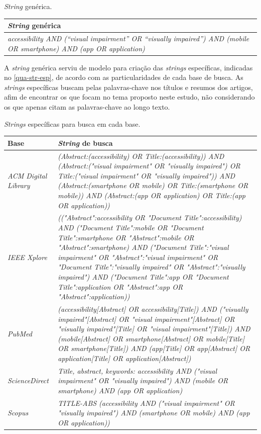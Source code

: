 \begin{quadro}[htb]
\caption{\label{qua-str-gen}\emph{String} genérica.}
\begin{tabular}{|m{11.5cm}|}
    \hline
    \textbf{\emph{String} genérica} \\
    \hline
    \emph{accessibility AND (“visual impairment” OR “visually impaired”) AND (mobile OR smartphone) AND (app OR application)} \\ \hline
\end{tabular}
\end{quadro}

A \emph{string} genérica serviu de modelo para criação das \emph{strings} específicas, indicadas no \autoref{qua-str-esp}, de acordo com as particularidades de cada base de busca. As \emph{strings} específicas buscam pelas palavras-chave nos títulos e resumos dos artigos, afim de encontrar os que focam no tema proposto neste estudo, não considerando os que apenas citam as palavras-chave ao longo texto.

\begin{quadro}[htb]
\caption{\label{qua-str-esp}\emph{Strings} específicas para busca em cada base.}
\begin{tabular}{|m{3.5cm} | m{11.5cm}|}
   \hline
   \textbf{Base} & \textbf{\emph{String} de busca} \\ \hline
    \emph{ACM Digital Library} & \emph{(Abstract:(accessibility) OR Title:(accessibility)) AND (Abstract:("visual impairment" OR "visually impaired") OR Title:("visual impairment" OR "visually impaired")) AND (Abstract:(smartphone OR mobile) OR Title:(smartphone OR mobile)) AND (Abstract:(app OR application) OR Title:(app OR application))} \\ \hline
    \emph{IEEE Xplore} & \emph{(("Abstract":accessibility OR "Document Title":accessibility) AND ("Document Title":mobile OR "Document Title":smartphone OR "Abstract":mobile OR "Abstract":smartphone) AND ("Document Title":"visual impairment" OR "Abstract":"visual impairment" OR "Document Title":"visually impaired" OR "Abstract":"visually impaired") AND ("Document Title":app OR "Document Title":application OR "Abstract":app OR "Abstract":application))} \\ \hline
    \emph{PubMed} & \emph{(accessibility[Abstract] OR accessibility[Title]) AND ("visually impaired"[Abstract] OR "visual impairment"[Abstract] OR "visually impaired"[Title] OR "visual impairment"[Title]) AND (mobile[Abstract] OR smartphone[Abstract] OR mobile[Title] OR smartphone[Title]) AND (app[Title] OR app[Abstract] OR application[Title] OR application[Abstract])} \\ \hline
    \emph{ScienceDirect} & \emph{Title, abstract, keywords: accessibility AND ("visual impairment" OR "visually impaired") AND (mobile OR smartphone) AND (app OR application)} \\ \hline
    \emph{Scopus} & \emph{TITLE-ABS (accessibility AND ("visual impairment" OR "visually impaired") AND (smartphone OR mobile) AND (app OR application))} \\ \hline
\end{tabular}
\end{quadro}

